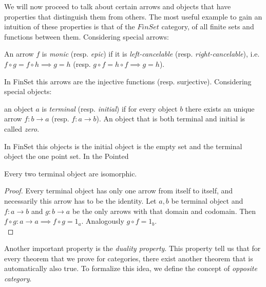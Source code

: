 We will now proceed to talk about certain arrows and objects that have properties that distinguish them from others.  The most useful example to gain an intuition of these properties is that of the $FinSet$ category, of all finite sets and functions between them.  Considering special arrows:\\

\begin{definition} An arrow $f$ is  \emph{monic} (resp. \emph{epic}) if it is \emph{left-cancelable} (resp. \emph{right-cancelable}), i.e.  $f\circ g = f \circ h \implies g = h$ (resp. $g\circ f = h \circ f \implies g = h$).
\end{definition}


 
In FinSet this arrows are the injective functions (resp. surjective). Considering special objects:

\begin{definition}
  an object $a$ is \emph{terminal} (resp. \emph{initial}) if for every object $b$ there exists an unique arrow $f:b\to a$ (resp. $f:a\to b$).  An object that is both terminal and initial is called \emph{zero}.
\end{definition}

  In FinSet this objects is the initial object is the  empty set and the terminal object the one point set. In the Pointed 

\begin{proposition}\label{terminal-proposition}
  Every two terminal object are isomorphic.
\end{proposition}
\begin{proof}
 Every terminal object has only one arrow from itself to itself, and necessarily this arrow has to be the identity. Let $a, b$ be terminal object and $f:a\to b$ and $g:b\to a$ be the only arrows with that domain and codomain. Then $f\circ g : a \to a \implies f \circ g = 1_a$. Analogously $g \circ f = 1_b$.\\
\end{proof}

Another important property is the \emph{duality property}. This property tell us that for every theorem that we prove for categories, there exist another theorem that is automatically also true. To formalize this idea, we define the concept of \emph{opposite category}.



